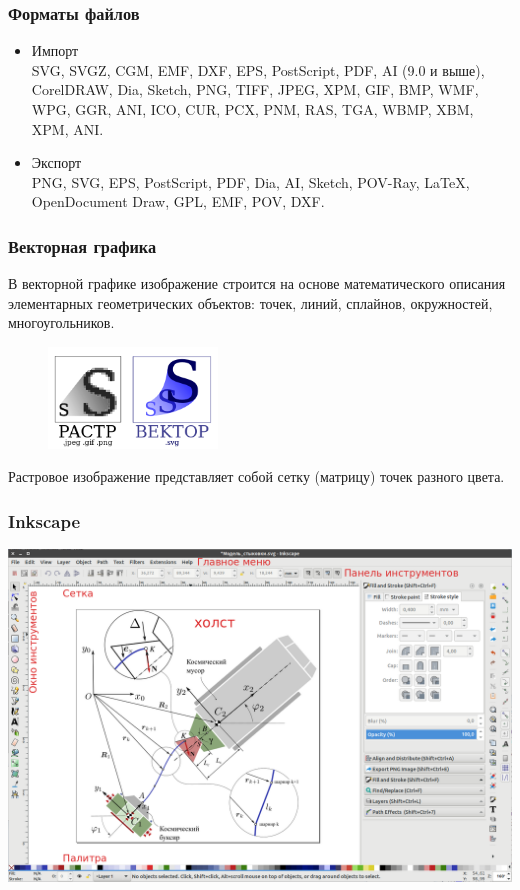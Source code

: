 \documentclass[12pt, compress]{beamer}
\renewcommand{\emph}[1]{\textcolor{dark-blue}{#1}}
\begin{document}
\begin{frame}
\frametitle{Форматы файлов}
\begin{itemize}
  \item Импорт \\
  SVG, SVGZ, CGM, EMF, DXF, EPS, PostScript, PDF, \alert{AI} (9.0 и выше), \alert{CorelDRAW}, Dia, Sketch, PNG, TIFF, JPEG, XPM, GIF, BMP, WMF, WPG, GGR, ANI, ICO, CUR, PCX, PNM, RAS, TGA, WBMP, XBM, XPM, ANI.
  \item Экспорт \\
  \alert{PNG}, SVG, \alert{EPS}, PostScript, \alert{PDF}, Dia, \alert{AI}, Sketch, POV-Ray, \alert{LaTeX}, OpenDocument Draw, GPL, \alert{EMF}, POV, \alert{DXF}.
\end{itemize}
\end{frame}

\begin{frame}
\frametitle{Векторная графика}
В \emph{векторной графике} изображение строится на основе математического описания элементарных геометрических объектов: точек, линий, сплайнов, окружностей, многоугольников.
\begin{figure}[htbp]
  \centering
  \includegraphics[width=0.4\textwidth]{растр-вектор.png}
\end{figure}
\vspace{5pt}

\emph{Растровое изображение} представляет собой сетку (матрицу) точек разного цвета.
\end{frame}

\begin{frame}[t]
\frametitle{Inkscape}
\includegraphics[width=1.0\textwidth]{inkscape1.png}
\end{frame}
\end{document}
